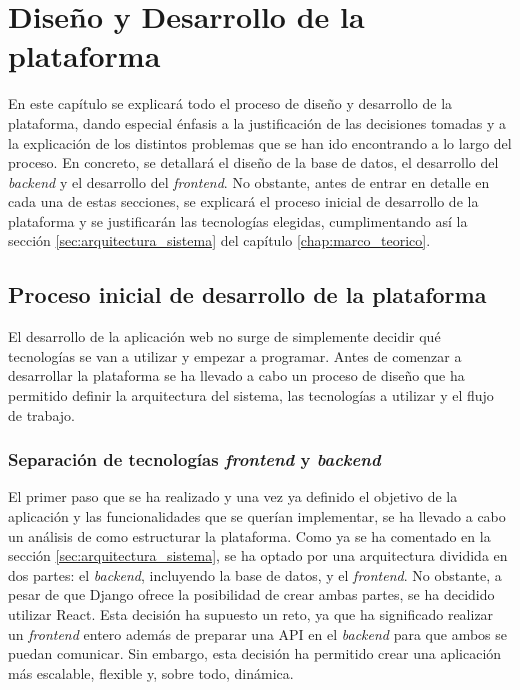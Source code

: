 \chapter{Diseño y Desarrollo de la plataforma}
\label{chap:diseno_desarrollo}

En este capítulo se explicará todo el proceso de diseño y desarrollo de la plataforma, dando especial énfasis a la justificación de las decisiones tomadas y a la explicación de los distintos problemas que se han ido encontrando a lo largo del proceso. En concreto, se detallará el diseño de la base de datos, el desarrollo del \textit{backend} y el desarrollo del \textit{frontend}. No obstante, antes de entrar en detalle en cada una de estas secciones, se explicará el proceso inicial de desarrollo de la plataforma y se justificarán las tecnologías elegidas, cumplimentando así la sección \ref{sec:arquitectura_sistema} del capítulo \ref{chap:marco_teorico}.



\section{Proceso inicial de desarrollo de la plataforma}
\label{sec:proceso_desarrollo}

El desarrollo de la aplicación web no surge de simplemente decidir qué tecnologías se van a utilizar y empezar a programar. Antes de comenzar a desarrollar la plataforma se ha llevado a cabo un proceso de diseño que ha permitido definir la arquitectura del sistema, las tecnologías a utilizar y el flujo de trabajo.

\subsection{Separación de tecnologías \textit{frontend} y \textit{backend}}

El primer paso que se ha realizado y una vez ya definido el objetivo de la aplicación y las funcionalidades que se querían implementar, se ha llevado a cabo un análisis de como estructurar la plataforma. Como ya se ha comentado en la sección \ref{sec:arquitectura_sistema}, se ha optado por una arquitectura dividida en dos partes: el \textit{backend}, incluyendo la base de datos, y el \textit{frontend}. No obstante, a pesar de que Django ofrece la posibilidad de crear ambas partes, se ha decidido utilizar React. Esta decisión ha supuesto un reto, ya que ha significado realizar un \textit{frontend} entero además de preparar una API en el \textit{backend} para que ambos se puedan comunicar. Sin embargo, esta decisión ha permitido crear una aplicación más escalable, flexible y, sobre todo, dinámica.

